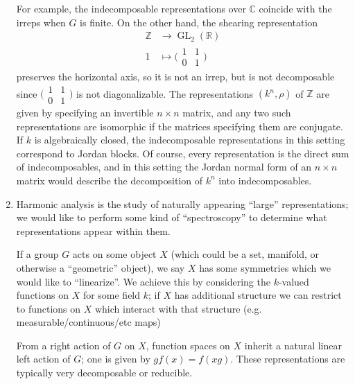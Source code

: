 \documentclass[11pt,leqno]{article}
\theoremstyle{plain}
\theoremstyle{definition}
\numberwithin{equation}{section}
\numberwithin{lem}{section}
\DeclareMathOperator{\GL}{GL}
\begin{document}
\begin{enumerate}
    For example, the indecomposable representations over $\mathbb C$ coincide with the irreps when $G$ is finite. On the other hand, the shearing representation 
    \begin{align*}
      \mathbb Z &\to \GL_2(\mathbb R)\\
      1 &\mapsto \big(\!\begin{smallmatrix}
        1 & 1 \\ 0 & 1
      \end{smallmatrix}\!\big)
    \end{align*}
    preserves the horizontal axis, so it is not an irrep, but is not decomposable since $\big(\!\begin{smallmatrix}
        1 & 1 \\ 0 & 1
    \end{smallmatrix}\!\big)$ is not diagonalizable. The representations $(k^n,\rho)$ of $\mathbb Z$ are given by specifying an invertible $n\times n$ matrix, and any two such representations are isomorphic if the matrices specifying them are conjugate. If $k$ is algebraically closed, the indecomposable representations in this setting correspond to Jordan blocks. Of course, every representation is the direct sum of indecomposables, and in this setting the Jordan normal form of an $n\times n$ matrix would describe the decomposition of $k^n$ into indecomposables.

    \item Harmonic analysis is the study of naturally appearing ``large'' representations; we would like to perform some kind of ``spectroscopy'' to determine what representations appear within them.
    
    If a group $G$ acts on some object $X$ (which could be a set, manifold, or otherwise a ``geometric'' object), we say $X$ has some symmetries which we would like to ``linearize''. We achieve this by considering the $k$-valued functions on $X$ for some field $k$; if $X$ has additional structure we can restrict to functions on $X$ which interact with that structure (e.g. measurable/continuous/etc maps)

    From a right action of $G$ on $X$, function spaces on $X$ inherit a natural linear left action of $G$; one is given by $gf(x) = f(xg)$. These representations are typically very decomposable or reducible.


\end{enumerate}
\end{document}

